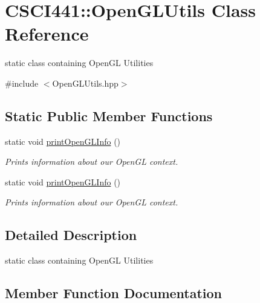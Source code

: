 \hypertarget{class_c_s_c_i441_1_1_open_g_l_utils}{}\section{C\+S\+C\+I441\+:\+:Open\+G\+L\+Utils Class Reference}
\label{class_c_s_c_i441_1_1_open_g_l_utils}


static class containing Open\+GL Utilities  




{\ttfamily \#include $<$Open\+G\+L\+Utils.\+hpp$>$}

\subsection*{Static Public Member Functions}
\begin{DoxyCompactItemize}
\item 
static void \hyperlink{class_c_s_c_i441_1_1_open_g_l_utils_a23e011241f0e95738bafa0b0404eb679}{print\+Open\+G\+L\+Info} ()
\begin{DoxyCompactList}\small\item\em Prints information about our Open\+GL context. \end{DoxyCompactList}\item 
static void \hyperlink{class_c_s_c_i441_1_1_open_g_l_utils_a6573ac10358f66b5c8a3bd57023106ba}{print\+Open\+G\+L\+Info} ()
\begin{DoxyCompactList}\small\item\em Prints information about our Open\+GL context. \end{DoxyCompactList}\end{DoxyCompactItemize}


\subsection{Detailed Description}
static class containing Open\+GL Utilities 

\subsection{Member Function Documentation}
\mbox{\label{class_c_s_c_i441_1_1_open_g_l_utils_a23e011241f0e95738bafa0b0404eb679}} 
